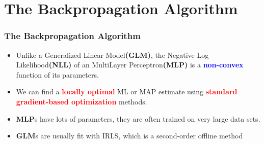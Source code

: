 \documentclass{beamer}
\begin{document}
\section{The Backpropagation Algorithm}
\begin{frame}
    \frametitle{The Backpropagation Algorithm}
	
    \begin{itemize}
    	\item Unlike a Generalized Linear Model\textbf{(GLM)}, the Negative Log Likelihood\textbf{(NLL)} of an MultiLayer Perceptron\textbf{(MLP)} is a \textbf{\textcolor{blue}{non-convex}} function of its parameters.
    	\item We can find a \textbf{\textcolor{red}{locally optimal}} ML or MAP estimate using \textbf{\textcolor{red}{standard gradient-based optimization}}
methods.
		\item \textbf{MLP}s have lots of parameters, they are often trained on very large data sets.
		\item \textbf{GLM}s are usually fit with IRLS, which is a second-order offline method
		
    \end{itemize}


\end{frame}
\end{document}

